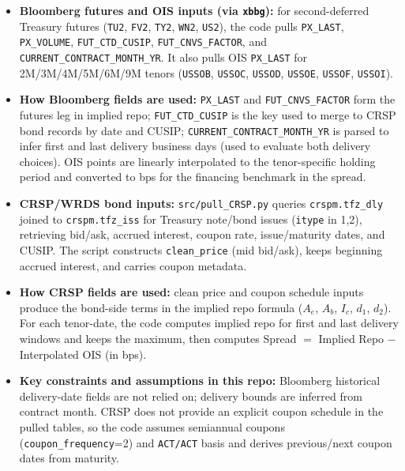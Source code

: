 \documentclass[12pt]{article}
\begin{document}
\begin{itemize}
\item \textbf{Bloomberg futures and OIS inputs (via \texttt{xbbg}):}
for second-deferred Treasury futures (\texttt{TU2}, \texttt{FV2}, \texttt{TY2}, \texttt{WN2}, \texttt{US2}),
the code pulls \texttt{PX\_LAST}, \texttt{PX\_VOLUME}, \texttt{FUT\_CTD\_CUSIP},
\texttt{FUT\_CNVS\_FACTOR}, and \texttt{CURRENT\_CONTRACT\_MONTH\_YR}. It also pulls OIS
\texttt{PX\_LAST} for 2M/3M/4M/5M/6M/9M tenors (\texttt{USSOB}, \texttt{USSOC}, \texttt{USSOD},
\texttt{USSOE}, \texttt{USSOF}, \texttt{USSOI}).

\item \textbf{How Bloomberg fields are used:}
\texttt{PX\_LAST} and \texttt{FUT\_CNVS\_FACTOR} form the futures leg in implied repo;
\texttt{FUT\_CTD\_CUSIP} is the key used to merge to CRSP bond records by date and CUSIP;
\texttt{CURRENT\_CONTRACT\_MONTH\_YR} is parsed to infer first and last delivery business days
(used to evaluate both delivery choices). OIS points are linearly interpolated to the tenor-specific
holding period and converted to bps for the financing benchmark in the spread.

\item \textbf{CRSP/WRDS bond inputs:}
\texttt{src/pull\_CRSP.py} queries \texttt{crspm.tfz\_dly} joined to \texttt{crspm.tfz\_iss}
for Treasury note/bond issues (\texttt{itype} in 1,2), retrieving bid/ask, accrued interest,
coupon rate, issue/maturity dates, and CUSIP. The script constructs
\texttt{clean\_price} (mid bid/ask), keeps beginning accrued interest, and carries coupon metadata.

\item \textbf{How CRSP fields are used:}
clean price and coupon schedule inputs produce the bond-side terms in the implied repo formula
(\(A_e\), \(A_b\), \(I_c\), \(d_1\), \(d_2\)). For each tenor-date, the code computes implied repo for
first and last delivery windows and keeps the maximum, then computes
Spread \(=\) Implied Repo \(-\) Interpolated OIS (in bps).

\item \textbf{Key constraints and assumptions in this repo:}
Bloomberg historical delivery-date fields are not relied on; delivery bounds are inferred from contract month.
CRSP does not provide an explicit coupon schedule in the pulled tables, so the code assumes semiannual coupons
(\texttt{coupon\_frequency}=2) and \texttt{ACT/ACT} basis and derives previous/next coupon dates from maturity.
\end{itemize}
\end{document}
